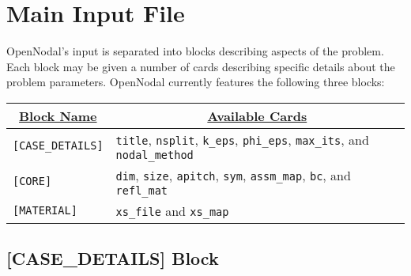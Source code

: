 \section{Main Input File}

OpenNodal's input is separated into blocks describing aspects of the problem.
Each block may be given a number of cards describing specific details about the problem parameters.
OpenNodal currently features the following three blocks:
\begin{table}[H]
\centering
  \begin{tabular}{|l|l|}
    \hline
    \multicolumn{1}{|c|}{{\ul \textbf{Block Name}}} & \multicolumn{1}{c|}{{\ul \textbf{Available Cards}}} \\ \hline
    \verb"[CASE_DETAILS]" & \verb"title", \verb"nsplit", \verb"k_eps", \verb"phi_eps", \verb"max_its", and \verb"nodal_method" \\ \hline
    \verb"[CORE]" & \verb"dim", \verb"size", \verb"apitch", \verb"sym", \verb"assm_map", \verb"bc", and \verb"refl_mat" \\ \hline
    \verb"[MATERIAL]" & \verb"xs_file" and \verb"xs_map" \\ \hline
  \end{tabular}
\end{table}

\subsection{[CASE\_DETAILS] Block}

